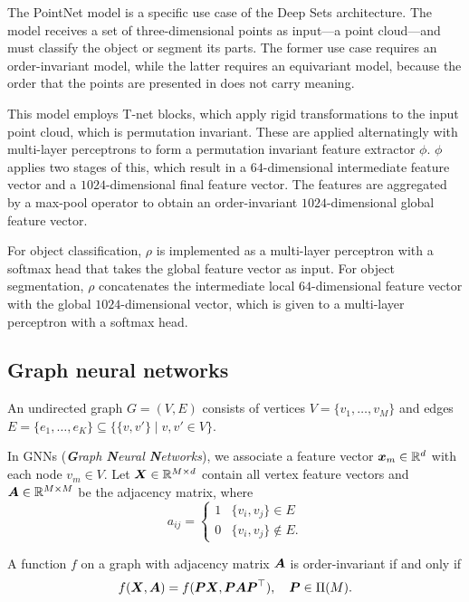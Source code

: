 The PointNet model \citep{qi2017pointnet} is a specific use case of the Deep Sets architecture. The
model receives a set of three-dimensional points as input---a point cloud---and must classify the
object or segment its parts. The former use case requires an order-invariant model, while the
latter requires an equivariant model, because the order that the points are presented in does not
carry meaning.

This model employs T-net blocks, which apply rigid transformations to the input point cloud, which
is permutation invariant. These are applied alternatingly with multi-layer perceptrons to form a
permutation invariant feature extractor $\phi$. $\phi$ applies two stages of this, which result in
a $64$-dimensional intermediate feature vector and a $1024$-dimensional final feature vector. The
features are aggregated by a max-pool operator to obtain an order-invariant $1024$-dimensional
global feature vector.

For object classification, $\rho$ is implemented as a multi-layer perceptron with a softmax head
that takes the global feature vector as input. For object segmentation, $\rho$ concatenates the
intermediate local $64$-dimensional feature vector with the global $1024$-dimensional vector, which
is given to a multi-layer perceptron with a softmax head.

\subsection{Graph neural networks}

\begin{definition}[Graph]
    An undirected graph $G=(V, E)$ consists of vertices $V = \{ v_1, \ldots, v_M \}$ and edges $E = \{ e_1, \ldots, e_K \} \subseteq \{ \{ v, v' \} \mid v, v' \in V \}$.
\end{definition}

In GNNs (\textit{\textbf{G}raph \textbf{N}eural \textbf{N}etworks}), we associate a feature vector
$\bm{x}_m \in \mathbb{R}^d$ with each node $v_m \in V$. Let $\bm{X} \in \mathbb{R}^{M \times d}$ contain all
vertex feature vectors and $\bm{A} \in \mathbb{R}^{M \times M}$ be the adjacency matrix, where \[
    a_{ij} = \begin{cases}
        1 & \{ v_i, v_j \} \in E      \\
        0 & \{ v_i, v_j \} \not\in E.
    \end{cases}
\]

\begin{definition}
    A function $f$ on a graph with adjacency matrix $\bm{A}$ is order-invariant if and only if \[
        f(\bm{X}, \bm{A}) = f(\bm{P}\bm{X}, \bm{P}\bm{A}\bm{P}^\top), \quad \bm{P} \in \Pi(M).
    \]
\end{definition}

